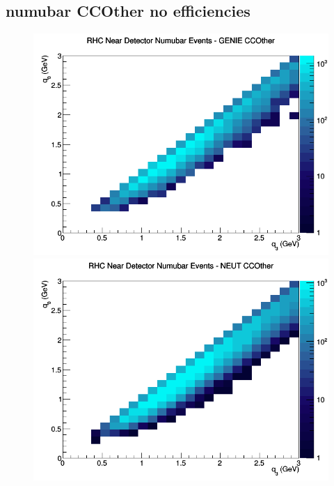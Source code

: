 \subsection{numubar CCOther no efficiencies}
\begin{figure}[h]
\includegraphics[width=\linewidth]{q0_q3/nominal/CCOther_RHC_ND_numubar_q3_q0_GENIE.png}
\endminipage
{}
\includegraphics[width=\linewidth]{q0_q3/nominal/CCOther_RHC_ND_numubar_q3_q0_NEUT.png}
\endminipage
{}

\end{figure}
